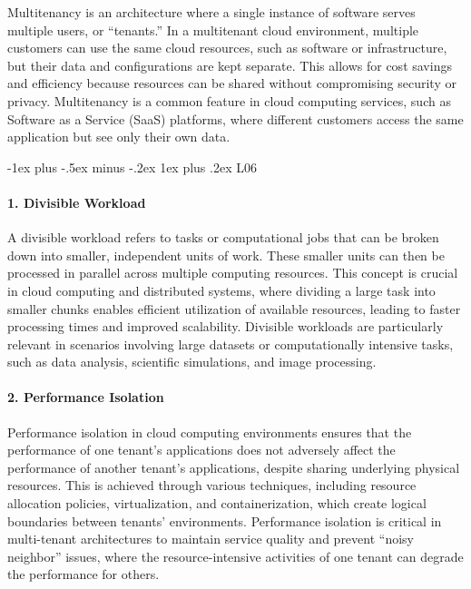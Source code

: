 \documentclass[10pt, landscape]{article}
\makeatletter
\renewcommand{\subsubsection}{\@startsection{subsubsection}{3}{0mm}%
  {-1ex plus -.5ex minus -.2ex}%
  {1ex plus .2ex}%
{\normalfont\small\bfseries}}%
\makeatother
\begin{document}
\begin{multicols*}{4}
Multitenancy is an architecture where a single instance of software
serves multiple users, or ``tenants.'' In a multitenant cloud
environment, multiple customers can use the same cloud resources, such
as software or infrastructure, but their data and configurations are
kept separate. This allows for cost savings and efficiency because
resources can be shared without compromising security or privacy.
Multitenancy is a common feature in cloud computing services, such as
Software as a Service (SaaS) platforms, where different customers access
the same application but see only their own data.

\subsubsection{L06}\label{l06}

\paragraph{1. Divisible Workload}\label{divisible-workload}

A divisible workload refers to tasks or computational jobs that can be
broken down into smaller, independent units of work. These smaller units
can then be processed in parallel across multiple computing resources.
This concept is crucial in cloud computing and distributed systems,
where dividing a large task into smaller chunks enables efficient
utilization of available resources, leading to faster processing times
and improved scalability. Divisible workloads are particularly relevant
in scenarios involving large datasets or computationally intensive
tasks, such as data analysis, scientific simulations, and image
processing.

\paragraph{2. Performance Isolation}\label{performance-isolation}

Performance isolation in cloud computing environments ensures that the
performance of one tenant's applications does not adversely affect the
performance of another tenant's applications, despite sharing underlying
physical resources. This is achieved through various techniques,
including resource allocation policies, virtualization, and
containerization, which create logical boundaries between tenants'
environments. Performance isolation is critical in multi-tenant
architectures to maintain service quality and prevent ``noisy neighbor''
issues, where the resource-intensive activities of one tenant can
degrade the performance for others.


\end{multicols*}
\end{document}
